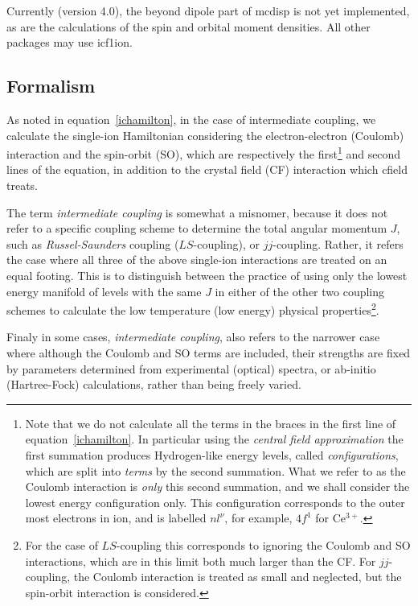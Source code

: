 Currently (version 4.0), the beyond dipole part of {\prg mcdisp} is not yet implemented, as are the calculations
of the spin and orbital moment densities. All other packages may use {\prg icf1ion}.

\subsection{Formalism}

As noted in equation~\ref{ichamilton}, in the case of intermediate coupling, we calculate
the single-ion Hamiltonian considering the electron-electron (Coulomb) interaction and the
spin-orbit (SO), which are respectively the first\footnote{Note that we do not calculate all the
terms in the braces in the first line of equation~\ref{ichamilton}. In particular using the
\emph{central field approximation} the first summation produces Hydrogen-like energy levels, called
\emph{configurations}, which are split into \emph{terms} by the second summation. What we refer to
as the Coulomb interaction is \emph{only} this second summation, and we shall consider the lowest
energy configuration only. This configuration corresponds to the outer most electrons in ion, and is
labelled $nl^\nu$, for example, $4f^1$ for Ce$^{3+}$.} and second lines of the equation, in addition
to the crystal field (CF) interaction which {\prg cfield} treats. 

The term \emph{intermediate coupling} is somewhat a misnomer, because it does not refer to a
specific coupling scheme to determine the total angular momentum $J$, such as
\emph{Russel-Saunders} coupling ($LS$-coupling), or $jj$-coupling. Rather, it refers the case where all
three of the above single-ion interactions are treated on an equal footing. This is to distinguish
between the practice of using only the lowest energy manifold of levels with the same $J$ in either
of the other two coupling schemes to calculate the low temperature (low energy) physical
properties\footnote{For the case of $LS$-coupling this corresponds to ignoring the Coulomb and SO
interactions, which are in this limit both much larger than the CF. For $jj$-coupling, the Coulomb
interaction is treated as small and neglected, but the spin-orbit interaction is considered.}.

Finaly in some cases, \emph{intermediate coupling}, also refers to the narrower case where although
the Coulomb and SO terms are included, their strengths are fixed by parameters determined from
experimental (optical) spectra, or ab-initio (Hartree-Fock) calculations, rather than being freely
varied.  

